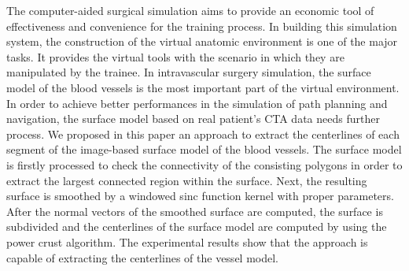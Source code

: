 
The computer-aided surgical simulation aims to provide an economic tool of effectiveness and convenience for the training process.
In building this simulation system, the construction of the virtual anatomic environment is one of the major tasks.
It provides the virtual tools with the scenario in which they are manipulated by the trainee.
In intravascular surgery simulation, the surface model of the blood vessels is the most important part of the virtual environment.
In order to achieve better performances in the simulation of path planning and navigation, the surface model based on real patient's CTA data needs further process.
We proposed in this paper an approach to extract the centerlines of each segment of the image-based surface model of the blood vessels.
The surface model is firstly processed to check the connectivity of the consisting polygons in order to extract the largest connected region within the surface.
Next, the resulting surface is smoothed by a windowed sinc function kernel with proper parameters.
After the normal vectors of the smoothed surface are computed, the surface is subdivided and the centerlines of the surface model are computed by using the power crust algorithm. %
The experimental results show that the approach is capable of extracting the centerlines of the vessel model.
